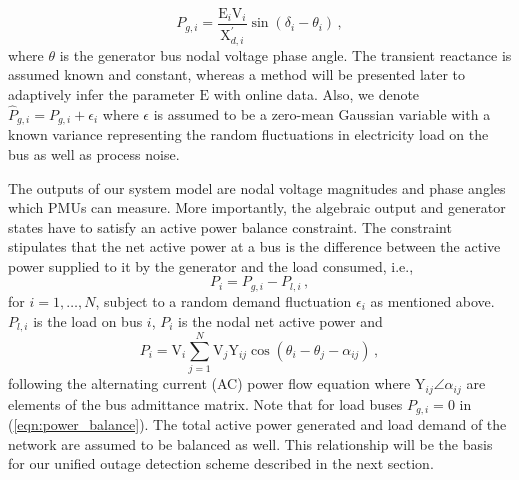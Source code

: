 \begin{equation}
\label{eqn:ae_continuous}
{P}_{g, i} = \frac{\text{E}_i\text{V}_i}{\text{X}_{d, i}^{'}}\sin (\delta_i - \theta_i)\,,
\end{equation}
where $\theta$ is the generator bus nodal voltage phase angle. The transient reactance is assumed known and constant, whereas a method will be presented later to adaptively infer the parameter $\text{E}$ with online data. Also, we denote $\hat{P}_{g, i} = P_{g, i} + \epsilon_i$ where $\epsilon$ is assumed to be a zero-mean Gaussian variable with a known variance representing the random fluctuations in electricity load on the bus as well as process noise. 

The outputs of our system model are nodal voltage magnitudes and phase angles which PMUs can measure. More importantly, the algebraic output and generator states have to satisfy an active power balance constraint. The constraint stipulates that the net active power at a bus is the difference between the active power supplied to it by the generator and the load consumed, i.e.,
\begin{equation}
\label{eqn:power_balance}
{P}_i = {P}_{g, i} - {P}_{l, i} \,,
\end{equation}
for $i = 1, \dots, N$, subject to a random demand fluctuation $\epsilon_i$ as mentioned above. ${P}_{l, i}$ is the load on bus $i$, ${P}_{i}$ is the nodal net active power and 
\begin{equation}
\label{eqn:ac_pf}
{P}_{i} = \text{V}_i \sum_{j=1}^{N} \text{V}_j \text{Y}_{ij} \cos (\theta_i - \theta_j - \alpha_{ij}) \,,
\end{equation} following the alternating current (AC) power flow equation where $\text{Y}_{ij}\angle\alpha_{ij}$ are elements of the bus admittance matrix. Note that for load buses ${P}_{g, i} = 0$ in (\ref{eqn:power_balance}). The total active power generated and load demand of the network are assumed to be balanced as well. This relationship will be the basis for our unified outage detection scheme described in the next section. 

